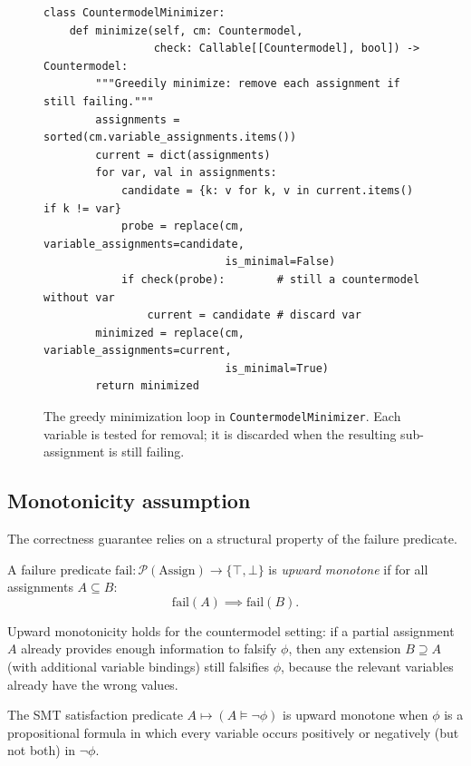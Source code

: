 \documentclass[11pt]{article}
\newcommand{\Fail}{\mathrm{fail}}          %
\begin{document}
\begin{figure}[ht]
\begin{lstlisting}[style=jugeo-python]
class CountermodelMinimizer:
    def minimize(self, cm: Countermodel,
                 check: Callable[[Countermodel], bool]) -> Countermodel:
        """Greedily minimize: remove each assignment if still failing."""
        assignments = sorted(cm.variable_assignments.items())
        current = dict(assignments)
        for var, val in assignments:
            candidate = {k: v for k, v in current.items() if k != var}
            probe = replace(cm, variable_assignments=candidate,
                            is_minimal=False)
            if check(probe):        # still a countermodel without var
                current = candidate # discard var
        minimized = replace(cm, variable_assignments=current,
                            is_minimal=True)
        return minimized
\end{lstlisting}
\caption{The greedy minimization loop in \texttt{CountermodelMinimizer}.
         Each variable is tested for removal; it is discarded when the
         resulting sub-assignment is still failing.}
\label{fig:minimizer}
\end{figure}

\subsection{Monotonicity assumption}

The correctness guarantee relies on a structural property of the
failure predicate.

\begin{definition}\label{def:upward-mono}
A failure predicate $\Fail : \mathcal{P}(\mathrm{Assign}) \to
\{\top,\bot\}$ is \emph{upward monotone} if for all assignments
$A \subseteq B$:
\[
  \Fail(A) \implies \Fail(B).
\]
\end{definition}

Upward monotonicity holds for the countermodel setting: if a partial
assignment $A$ already provides enough information to falsify $\phi$,
then any extension $B \supseteq A$ (with additional variable bindings)
still falsifies $\phi$, because the relevant variables already have the
wrong values.

\begin{proposition}\label{prop:smt-upward-mono}
The SMT satisfaction predicate $A \mapsto (A \models \neg\phi)$ is
upward monotone when $\phi$ is a propositional formula in which every
variable occurs positively or negatively (but not both) in $\neg\phi$.
\end{proposition}
\end{document}
